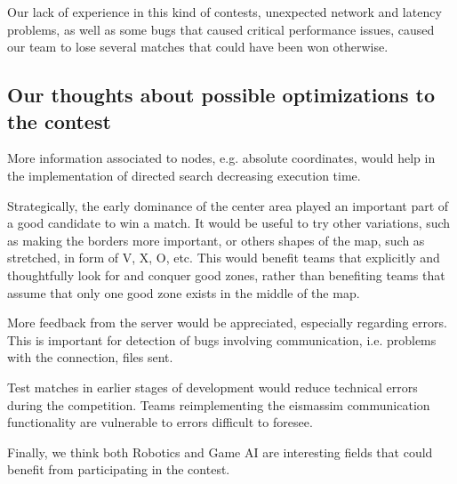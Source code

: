 \documentclass{llncs2e/llncs}
\begin{document}
    Our lack of experience in this kind of contests, unexpected network and
    latency problems, as well as some bugs that caused critical performance
    issues, caused our team to lose several matches that could have been won
    otherwise.

\subsection{Our thoughts about possible optimizations to the contest}
    
    More information associated to nodes, e.g. absolute coordinates, would help
    in the implementation of directed search decreasing execution time.

    Strategically, the early dominance of the center area played an important part 
    of a good candidate to win a match. It would be useful to try other 
    variations, such as making the borders more important, or others shapes of the 
    map, such as stretched, in form of V, X, O, etc. This would benefit teams that 
    explicitly and thoughtfully look for and conquer good zones, rather than 
    benefiting teams that assume that only one good zone exists in the middle of the map.

    More feedback from the server would be appreciated, especially
    regarding errors. This is important for detection of bugs
    involving communication, i.e. problems with the connection, files sent.

    Test matches in earlier stages of development would reduce technical
    errors during the competition.  Teams reimplementing the eismassim
    communication functionality are vulnerable to errors difficult to foresee. 
    
    Finally, we think both Robotics and Game AI are interesting fields that could 
    benefit from participating in the contest.

    
 
 


\end{document}
